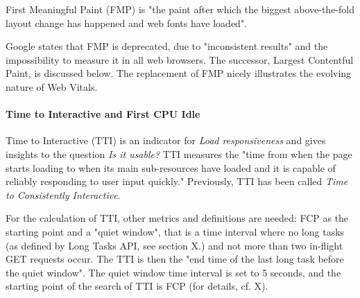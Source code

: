 First Meaningful Paint (FMP) is "the paint after which the biggest above-the-fold layout change has happened and web fonts have loaded". %

Google states that FMP is deprecated, due to "inconsistent results" and the impossibility to measure it in all web browsers. %
The successor, Largest Contentful Paint, is discussed below.
The replacement of FMP nicely illustrates the evolving nature of Web Vitals.







\paragraph{Time to Interactive and First CPU Idle}


Time to Interactive (TTI) is an indicator for \textit{Load responsiveness} and gives insights to the question \textit{Is it usable?}
TTI measures the "time from when the page starts loading to when its main sub-resources have loaded and it is capable of reliably responding to user input quickly."
Previously, TTI has been called \textit{Time to Consistently Interactive}. %

For the calculation of TTI, other metrics and definitions are needed:
FCP as the starting point and a "quiet window", that is a time interval where no long tasks (as defined by Long Tasks API, see section X.) and not more than two in-flight GET requests occur. %
The TTI is then the "end time of the last long task before the quiet window".
The quiet window time interval is set to 5 seconds, and the starting point of the search of TTI is FCP (for details, cf. X).

